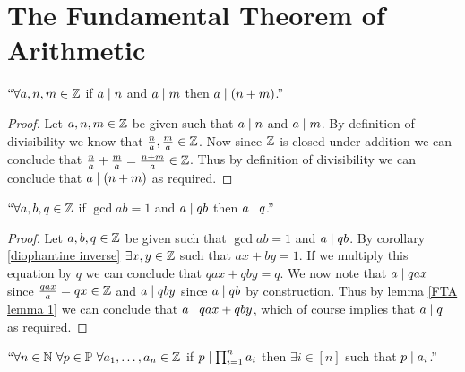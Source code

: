     \section{The Fundamental Theorem of Arithmetic}
        \begin{lemma}
            $``\forall a, n, m \in \mathbb{Z}$ if $a \mid n$ and $a \mid m$ then
            $a \mid (n + m)$.''
            \label{FTA lemma 1}
        \end{lemma}
        \begin{proof}
            Let $a, n, m \in \mathbb{Z}$ be given such that $a \mid n$ and $a \mid m$.
            By definition of divisibility we know that $\frac{n}{a}, \frac{m}{a} \in \mathbb{Z}$.
            Now since $\mathbb{Z}$ is closed under addition we can conclude that 
            $\frac{n}{a} + \frac{m}{a} = \frac{n + m}{a} \in \mathbb{Z}$. Thus by definition of
            divisibility we can conclude that $a \mid (n + m)$ as required.
            \QED
        \end{proof}
        \begin{lemma}
            $``\forall a, b, q \in \mathbb{Z}$ if $\gcd{a}{b} = 1$ and $a \mid qb$ then
            $a \mid q$.''
            \label{FTA lemma 2}
        \end{lemma}
        \begin{proof}
            Let $a, b, q \in \mathbb{Z}$ be given such that $\gcd{a}{b} = 1$ and $a \mid qb$.
            By corollary \ref{diophantine inverse} $\exists x, y \in \mathbb{Z}$ such that
            $ax + by = 1$. If we multiply this equation by $q$ we can conclude that
            $qax + qby = q$. We now note that $a \mid qax$ since $\frac{qax}{a} = qx \in \mathbb{Z}$
            and $a \mid qby$ since $a \mid qb$ by construction. Thus by
            lemma \ref{FTA lemma 1} we can conclude that $a \mid qax + qby$, which of course
            implies that $a \mid q$ as required. \QED
        \end{proof}
        \begin{lemma}
            $``\forall n \in \mathbb{N} \ \forall p \in \mathbb{P} \ \forall a_1, \dots, a_n \in \mathbb{Z}$
            if $p \mid \prod_{i = 1}^{n} a_i$ then $\exists i \in [n]$ such that $p \mid a_i$.''
            \label{FTA Lemma 3}
        \end{lemma}
